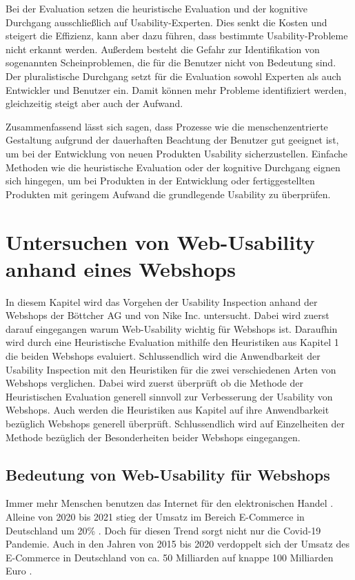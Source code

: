 \documentclass[utf8,biblatex]{lni}
\begin{document}
Bei der Evaluation setzen die heuristische Evaluation und der kognitive Durchgang ausschließlich auf Usability-Experten. Dies senkt die Kosten und steigert die Effizienz, kann aber dazu führen, dass bestimmte Usability-Probleme nicht erkannt werden. Außerdem besteht die Gefahr zur Identifikation von sogenannten \glqq Scheinproblemen\grqq{}, die für die Benutzer nicht von Bedeutung sind. Der pluralistische Durchgang setzt für die Evaluation sowohl Experten als auch Entwickler und Benutzer ein. Damit können mehr Probleme identifiziert werden, gleichzeitig steigt aber auch der Aufwand.

Zusammenfassend lässt sich sagen, dass Prozesse wie die menschenzentrierte Gestaltung aufgrund der dauerhaften Beachtung der Benutzer gut geeignet ist, um bei der Entwicklung von neuen Produkten Usability sicherzustellen. Einfache Methoden wie die heuristische Evaluation oder der kognitive Durchgang eignen sich hingegen, um bei Produkten in der Entwicklung oder fertiggestellten Produkten mit geringem Aufwand die grundlegende Usability zu überprüfen. 

\clearpage



\section{Untersuchen von Web-Usability anhand eines Webshops}
In diesem Kapitel wird das Vorgehen der Usability Inspection anhand der Webshops der Böttcher AG und von Nike Inc. untersucht. Dabei wird zuerst darauf eingegangen warum Web-Usability wichtig für Webshops ist. Daraufhin wird durch eine Heuristische Evaluation mithilfe den Heuristiken aus Kapitel 1 die beiden Webshops evaluiert. Schlussendlich wird die Anwendbarkeit der Usability Inspection mit den Heuristiken für die zwei verschiedenen Arten von Webshops verglichen. Dabei wird zuerst überprüft ob die Methode der Heuristischen Evaluation generell sinnvoll zur Verbesserung der Usability von Webshops. Auch werden die Heuristiken aus Kapitel auf ihre Anwendbarkeit bezüglich Webshops generell überprüft. Schlussendlich wird auf Einzelheiten der Methode bezüglich der Besonderheiten beider Webshops eingegangen.


\subsection{Bedeutung von Web-Usability für Webshops}
Immer mehr Menschen benutzen das Internet für den elektronischen Handel \cite{Chariton2002}. Alleine von 2020 bis 2021 stieg der Umsatz im Bereich E-Commerce in Deutschland um 20\% \cite{Rusche2021}. Doch für diesen Trend sorgt nicht nur die Covid-19 Pandemie. Auch in den Jahren von 2015 bis 2020 verdoppelt sich der Umsatz des E-Commerce in Deutschland von ca. 50 Milliarden auf knappe 100 Milliarden Euro \cite{Rusche2021}. 
\end{document}
